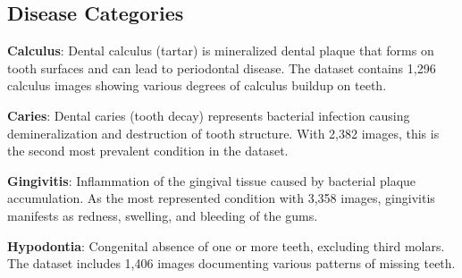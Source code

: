 \begin{table}[htbp]
\centering
\caption{Oral Diseases Dataset Statistics}
\label{tab:dataset_stats}
\end{table}

\subsection{Disease Categories}

\textbf{Calculus}: Dental calculus (tartar) is mineralized dental plaque that forms on tooth surfaces and can lead to periodontal disease. The dataset contains 1,296 calculus images showing various degrees of calculus buildup on teeth.

\textbf{Caries}: Dental caries (tooth decay) represents bacterial infection causing demineralization and destruction of tooth structure. With 2,382 images, this is the second most prevalent condition in the dataset.

\textbf{Gingivitis}: Inflammation of the gingival tissue caused by bacterial plaque accumulation. As the most represented condition with 3,358 images, gingivitis manifests as redness, swelling, and bleeding of the gums.

\textbf{Hypodontia}: Congenital absence of one or more teeth, excluding third molars. The dataset includes 1,406 images documenting various patterns of missing teeth.

